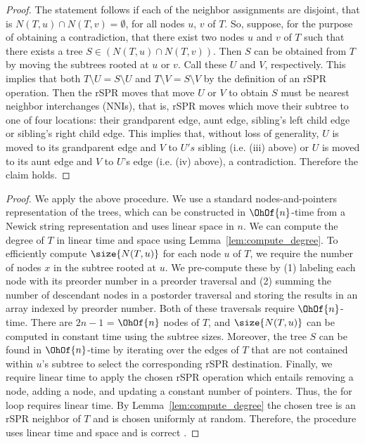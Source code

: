 \documentclass[11pt,onecolumn,conference]{IEEEtran}
\newcommand{\cuttable}[2][]{%
    \ifthenelse{\equal{#1}{}}%
		{}%
		{#1}%
}
\begin{document}
\computedegree*
\begin{proof}
	The statement follows if each of the neighbor assignments are disjoint, that is $N(T,u) \cap N(T,v) = \emptyset$, for all nodes $u$, $v$ of $T$.
	So, suppose, for the purpose of obtaining a contradiction, that there exist two nodes $u$ and $v$ of $T$ such that there exists a tree $S \in (N(T,u) \cap N(T,v))$.
	Then $S$ can be obtained from $T$ by moving the subtrees rooted at $u$ or $v$.
	Call these $U$ and $V$, respectively.
	This implies that both $T \setminus U = S \setminus U$ and $T \setminus V = S \setminus V$ by the definition of an rSPR operation.
	Then the rSPR moves that move $U$ or $V$ to obtain $S$ must be nearest neighbor interchanges (NNIs), that is, rSPR moves which move their subtree to one of four locations: their grandparent edge, aunt edge, sibling's left child edge or sibling's right child edge.
	This implies that, without loss of generality, $U$ is moved to its grandparent edge and $V$ to $U's$ sibling (i.e. (iii) above) or $U$ is moved to its aunt edge and $V$ to $U$'s edge (i.e. (iv) above), a contradiction.
	Therefore the claim holds.
\end{proof}

\selectrandomneighbor*
\begin{proof}
	We apply the above procedure.
	We use a standard nodes-and-pointers representation of the trees, which can be constructed in $\OhOf{n}$-time from a Newick string representation and uses linear space in $n$.
	We can compute the degree of $T$ in linear time and space using Lemma~\ref{lem:compute_degree}.
	To efficiently compute $\size{N(T,u)}$ for each node $u$ of $T$, we require the number of nodes $x$ in the subtree rooted at $u$.
	We pre-compute these by (1) labeling each node with its preorder number in a preorder traversal and (2) summing the number of descendant nodes in a postorder traversal and storing the results in an array indexed by preorder number.
	Both of these traversals require $\OhOf{n}$-time.
	There are $2n-1$ = $\OhOf{n}$ nodes of $T$, and $\size{N(T,u)}$ can be computed in constant time using the subtree sizes.
	Moreover, the tree $S$ can be found in $\OhOf{n}$-time by iterating over the edges of $T$ that are not contained within $u$'s subtree to select the corresponding rSPR destination.
	Finally, we require linear time to apply the chosen rSPR operation which entails removing a node, adding a node, and updating a constant number of pointers.
	Thus, the for loop requires linear time.
	By Lemma~\ref{lem:compute_degree} the chosen tree is an rSPR neighbor of $T$ and is chosen uniformly at random.
	Therefore, the procedure uses linear time and space and \cuttable[is correct]{selects an rSPR neighbor of $T$ uniformly at random}.
\end{proof}
\end{document}
